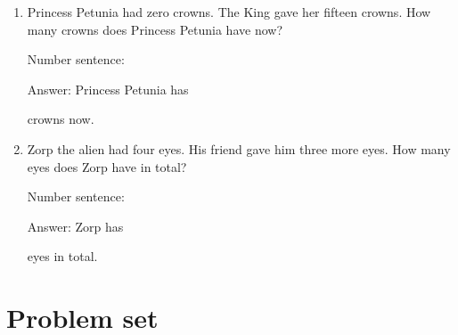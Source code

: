 \documentclass{tufte-book}
\begin{document}
\begin{enumerate}
\item
  Princess Petunia had zero crowns. The King gave her fifteen crowns.
  How many crowns does Princess Petunia have now?\medskip\par
  Number sentence:
  \dotfill\medskip\par
  Answer: Princess Petunia has
  \dotfill\medskip\par\mbox{}\dotfill\medskip\par\mbox{}\dotfill\bigskip
  crowns now.
\item
  Zorp the alien had four eyes. His friend gave him three more eyes. How
  many eyes does Zorp have in total?\medskip\par
  Number sentence:
  \dotfill\medskip\par
  Answer: Zorp has
  \dotfill\medskip\par\mbox{}\dotfill\medskip\par\mbox{}\dotfill\bigskip
  eyes in total.
\end{enumerate}



\clearpage\section{Problem set }
\end{document}
